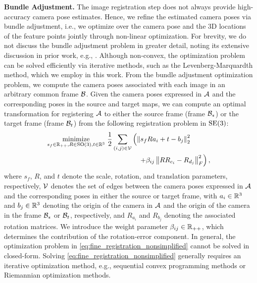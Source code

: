 \smallskip
\noindent\textbf{Bundle Adjustment.}
The image registration step does not always provide high-accuracy camera pose estimates. Hence, we refine the estimated camera poses via bundle adjustment, i.e., we optimize over the camera pose and the $3$D locations of the feature points jointly through non-linear optimization. For brevity, we do not discuss the bundle adjustment problem in greater detail, noting its extensive discussion in prior work, e.g., \cite{schonberger2016structure}.  Although non-convex, the optimization problem can be solved efficiently via iterative methods, such as the Levenberg-Marquardth method, which we employ in this work. From the bundle adjustment optimization problem, we compute the camera poses associated with each image in an arbitrary common frame $\mathcal{B}$. Given the camera poses expressed in $\mathcal{A}$ and the corresponding poses in the source and target maps, we can compute an optimal transformation for registering $\mathcal{A}$ to either the source frame (frame $\mathcal{B}_{s}$) or the target frame (frame $\mathcal{B}_{t}$) from the following registration problem in $\mathrm{SE}(3)$:
\begin{equation}
    \label{eq:fine_registration_nonsimplified}
    \begin{aligned}
        \underset{s_{f} \in \mathbb{R}_{++}, R \in \mathrm{SO}(3), t \in \mathbb{R}^{3}}{\mathrm{minimize}}\  \frac{1}{2} \sum_{(i, j) \in \mathcal{V}} & \left(\left\Vert s_{f}Ra_{i} + t - b_{j} \right\Vert_{2}^{2} \right. \\
        &\quad \left. + \beta_{ij} \left\Vert R R_{c_{i}} - R_{d_{j}} \right\Vert_{F}^{2} \right),
    \end{aligned}
\end{equation}
where ${s_{f}}$, ${R}$, and ${t}$ denote the scale, rotation, and translation parameters, respectively, $\mathcal{V}$ denotes the set of edges between the camera poses expressed in $\mathcal{A}$ and the corresponding poses in either the source or target frame, with ${a_{i} \in \mathbb{R}^{3}}$ and ${b_{j} \in \mathbb{R}^{3}}$ denoting the origin of the camera in $\mathcal{A}$ and the origin of the camera in the frame $\mathcal{B}_{s}$ or $\mathcal{B}_{t}$, respectively, and ${R_{a_{i}}}$ and ${R_{b_{j}}}$ denoting the associated rotation matrices. We introduce the weight parameter ${\beta_{ij} \in \mathbb{R}_{++}}$, which determines the contribution of the rotation-error component. In general, the optimization problem in \eqref{eq:fine_registration_nonsimplified} cannot be solved in closed-form. Solving \eqref{eq:fine_registration_nonsimplified} generally requires an iterative optimization method, e.g., sequential convex programming methods or Riemannian optimization methods.
